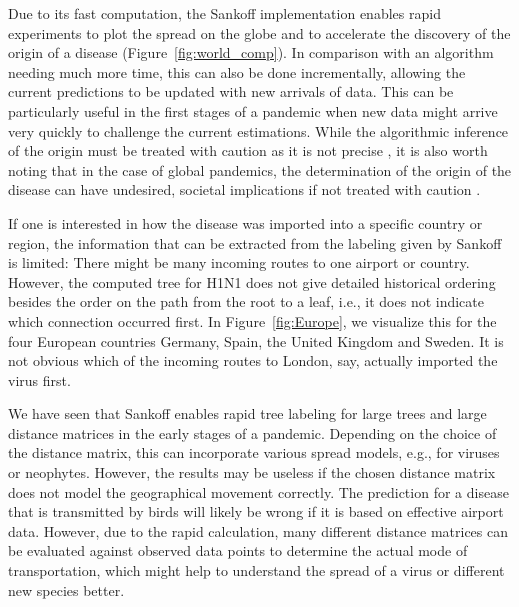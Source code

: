 \documentclass{article}
\begin{document}
Due to its fast computation, the Sankoff implementation enables rapid
experiments to plot the spread on the globe and to accelerate the discovery of
the origin of a disease (Figure~\ref{fig:world_comp}). In comparison with an
algorithm needing much more time, this can also be done incrementally, allowing
the current predictions to be updated with new arrivals of data. This can be
particularly useful in the first stages of a pandemic when new data might arrive
very quickly to challenge the current estimations. While the algorithmic
inference of the origin must be treated with caution as it is not precise
\cite{reimeringPhylogeographicReconstructionUsing2020}, it is also worth noting
that in the case of global pandemics, the determination of the origin of the
disease can have undesired, societal implications if not treated with caution
\cite{chenPotentialImpactCOVID192020}.

If one is interested in how the disease was imported into a specific country or
region, the information that can be extracted from the labeling given by Sankoff
is limited: There might be many incoming routes to one airport or country.
However, the computed tree for H1N1 does not give detailed historical ordering
besides the order on the path from the root to a leaf, i.e., it does not
indicate which connection occurred first. In Figure~\ref{fig:Europe}, we
visualize this for the four European countries Germany, Spain, the United
Kingdom and Sweden. It is not obvious which of the incoming routes to London,
say, actually imported the virus first.

We have seen that Sankoff enables rapid tree labeling for large trees and large
distance matrices in the early stages of a pandemic. Depending on the choice of
the distance matrix, this can incorporate various spread models, e.g., for
viruses or neophytes. However, the results may be useless if the chosen distance
matrix does not model the geographical movement correctly. The prediction for a
disease that is transmitted by birds will likely be wrong if it is based on
effective airport data. However, due to the rapid calculation, many different
distance matrices can be evaluated against observed data points to determine the
actual mode of transportation, which might help to understand the spread of a
virus or different new species better.
\end{document}
